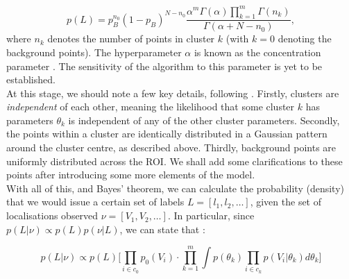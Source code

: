 \documentclass[11pt]{article}
\begin{document}

\begin{equation} \label{priorProbability}
	p(L) = p_B^{n_0} (1-p_B)^{N - n_0} \frac{\alpha^m \Gamma(\alpha) \prod_{k = 1}^m \Gamma(n_k)
											}{\Gamma(\alpha + N - n_0)
										},
\end{equation}
where $n_k$ denotes the number of points in cluster $k$ (with $k=0$ denoting the background points). The hyperparameter $\alpha$ is known as the concentration parameter \cite{Rubin-Delanchy2015}. The sensitivity of the algorithm to this parameter is yet to be established. \\

At this stage, we should note a few key details, following \cite{Rubin-Delanchy2015}. Firstly, 
clusters are \textit{independent} of each other, meaning the likelihood that some cluster $k$ has parameters $\theta_k$ is independent of any of the other cluster parameters. Secondly, the points within a cluster are identically distributed in a Gaussian pattern around the cluster centre, as described above. Thirdly, background points are uniformly distributed across the ROI. We shall add some clarifications to these points after introducing some more elements of the model.\\ 


With all of this, and Bayes' theorem, we can calculate the probability (density) that we would issue a certain set of labels $L = [l_1, l_2, \dots]$, given the set of localisations observed $\nu = [V_1, V_2, \dots]$. In particular, since $p(L|\nu) \propto p(L)p(\nu|L)$, we can state that \cite{Rubin-Delanchy2015}:

\begin{equation} \label{probLGivenV}
	p(L|\nu) \propto p(L) \Bigg[
			\underset{i \in c_0}{\prod} p_0(V_i) \cdot
			\overset{m}{\underset{k = 1}{\prod}}\int p(\theta_k)
			\underset{i \in c_k}{\prod}p(V_i | \theta_k) d\theta_k
%			
	\Bigg]
\end{equation}
\end{document}
